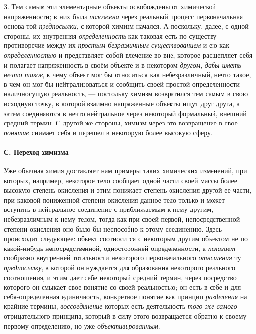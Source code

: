 \documentclass[twoside]{article}
\begin{document}
{{{3. Тем самым эти элементарные объекты освобождены от
химической напряженности; в них была
{\em положена} через
реальный процесс первоначальная основа той
{\em предпосылки}, с
которой химизм начался. А поскольку, далее, с одной стороны, их внутренняя
{\em определенность} как
таковая есть по существу противоречие между их
{\em простым безразличным
существованием} и ею как
{\em определенностью} и
представляет собой влечение во-вне, которое расщепляет себя и полагает
напряженность в своём объекте и в некотором
{\em другом},
{\em дабы иметь нечто такое},
к чему объект мог бы относиться как небезразличный, нечто
такое, в чем он мог бы нейтрализоваться и сообщить своей простой
определенности наличносущую реальность, — постольку химизм
возвратился тем самым в свою исходную точку, в которой взаимно напряженные
объекты ищут друг друга, а затем соединяются в нечто нейтральное через
некоторый формальный, внешний средний термин. С другой же стороны, химизм
через это возвращение в свое
{\em понятие} снимает
себя и перешел в некоторую более высокую сферу.

\paragraph[С.Переход химизма]{С. Переход химизма}
Уже обычная химия доставляет нам примеры таких химических
изменений, при которых, например, некоторое тело сообщает одной части своей
массы более высокую степень окисления и этим понижает степень окисления
другой ее части, при каковой пониженной степени окисления данное тело
только и может вступить в нейтральное соединение с приближаемым к нему
другим, небезразличным к нему телом, тогда как при своей первой,
непосредственной степени окисления оно было бы неспособно к этому
соединению. Здесь происходит следующее: объект соотносится с некоторым
другим объектом не по какой-нибудь непосредственной, односторонней
определенности, а {\em полагает}
сообразно внутренней тотальности некоторого
первоначального {\em отношения}
ту {\em предпосылку},
в которой он нуждается для образования некоторого реального
соотношения, и этим дает себе некоторый средний термин, через посредство
которого он смыкает свое понятие со своей реальностью; он есть
в-себе-и-для-себя-определенная единичность, конкретное понятие
как принцип {\em разделения}
на крайние термины,
{\em воссоединение}
которых есть деятельность
{\em того же самого}
отрицательного принципа, который в силу этого возвращается
обратно к своему первому определению, но уже
{\em объективированным}.

}}}
\end{document}
